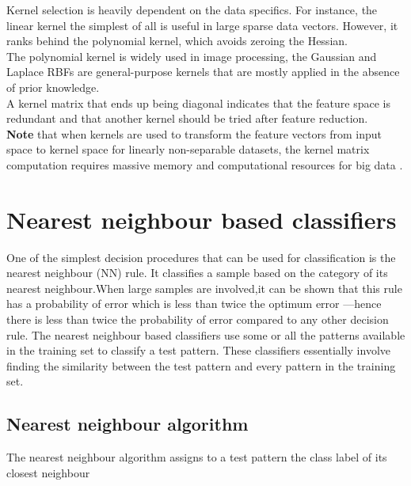Kernel selection is heavily dependent on the data specifics. For instance, the linear kernel the simplest
of all is useful in large sparse data vectors. However, it ranks behind the polynomial kernel, which avoids zeroing the Hessian. \\The polynomial kernel is widely used in image processing, the Gaussian and Laplace RBFs are general-purpose kernels that are mostly applied in the absence of prior knowledge. \\A kernel matrix that ends up being diagonal indicates that the feature space is redundant and that another kernel should be tried after feature reduction.\\\textbf{
Note} that when kernels are used to transform the feature vectors from input space to kernel space for linearly non-separable datasets, the kernel matrix computation requires massive memory and computational resources for big data . 



\section{Nearest neighbour based classifiers}

One of the simplest decision procedures that can be used for classification is the
nearest neighbour (NN) rule. It classifies a sample based on the category of its nearest
neighbour.When large samples are involved,it can be shown that this rule has a
probability of error which is less than twice the optimum error
—hence there is less
than twice the probability of error compared to any other decision rule. The nearest
neighbour based classifiers use some or all the patterns available in the training set
to classify a test pattern. These classifiers essentially involve finding the similarity
between the test pattern and every pattern in the training set.

\subsection{Nearest neighbour algorithm}
The nearest neighbour algorithm assigns to a test pattern the class label of its closest
neighbour


